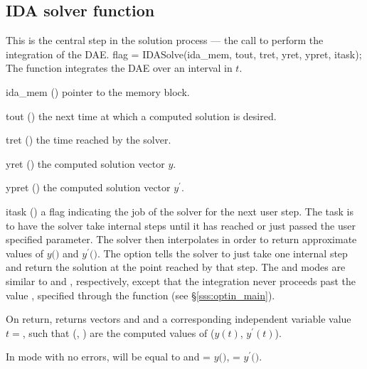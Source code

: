 {\subsection{IDA solver function}\label{sss:idasolve}
%
This is the central step in the solution process --- the call to perform the
integration of the DAE.
%
{
  flag = IDASolve(ida\_mem, tout, tret, yret, ypret, itask);
}
{
  The function  integrates the DAE over an interval in $t$.
}
{
  \begin{args}
  \item[ida\_mem] ()
    pointer to the {\ida} memory block.
  \item[tout] ()
    the next time at which a computed solution is desired.
  \item[tret] ()
    the time reached by the solver.
  \item[yret] ()
    the computed solution vector $y$.
  \item[ypret] ()
    the computed solution vector $y^\prime$.
  \item[itask] ()
    a flag indicating the job of the solver for the next user step. 
    The  task is to have the solver take internal steps until   
    it has reached or just passed the user specified 
    parameter. The solver then interpolates in order to   
    return approximate values of $y($$)$ and $y^\prime($$)$. 
    The  option tells the solver to just take one internal step  
    and return the solution at the point reached by that step. 
    The  and  modes are     
    similar to  and , respectively, except    
    that the integration never proceeds past the value , specified
    through the function  (see \S\ref{sss:optin_main}).
  \end{args}
}
{
  On return,  returns vectors  and  and a
  corresponding  independent variable value $t=$, such that (,
  ) are the computed values of ($y(t)$, $y^\prime(t)$).

  In  mode with no errors,  will be equal to  
  and  = $y($$)$,  = $y^\prime($$)$.

}}
